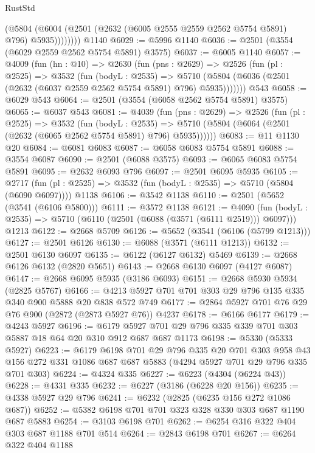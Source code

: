 \begin{lexlean}{RustStd}
\begin{coremodule}
              (@5804 (@6004 (@2501 (@2632 (@6005 @2555 @2559 @2562 @5754 @5891) @796) @5935))))))))
    @1140
@6029 := @5996 @1140
@6036 := @2501 (@3554 (@6029 @2559 @2562 @5754 @5891) @3575)
@6037 := @6005 @1140
@6057 := @4009
    (fun (hn : @10) =>
    @2630
      (fun (pns : @2629) =>
      @2526
        (fun (pl : @2525) =>
        @3532
          (fun (bodyL : @2535) =>
          @5710 (@5804 (@6036 (@2501 (@2632 (@6037 @2559 @2562 @5754 @5891) @796) @5935)))))))
    @543
@6058 := @6029 @543
@6064 := @2501 (@3554 (@6058 @2562 @5754 @5891) @3575)
@6065 := @6037 @543
@6081 := @4039
    (fun (pns : @2629) =>
    @2526
      (fun (pl : @2525) =>
      @3532
        (fun (bodyL : @2535) =>
        @5710 (@5804 (@6064 (@2501 (@2632 (@6065 @2562 @5754 @5891) @796) @5935))))))
@6083 := @11 @1130 @20
@6084 := @6081 @6083
@6087 := @6058 @6083 @5754 @5891
@6088 := @3554 @6087
@6090 := @2501 (@6088 @3575)
@6093 := @6065 @6083 @5754 @5891
@6095 := @2632 @6093 @796
@6097 := @2501 @6095 @5935
@6105 := @2717
    (fun (pl : @2525) => @3532 (fun (bodyL : @2535) => @5710 (@5804 (@6090 @6097))))
    @1138
@6106 := @3542 @1138
@6110 := @2501 (@5652 (@3541 (@6106 @5800)))
@6111 := @3572 @1138
@6121 := @4090
    (fun (bodyL : @2535) => @5710 (@6110 (@2501 (@6088 (@3571 (@6111 @2519))) @6097)))
    @1213
@6122 := @2668 @5709
@6126 := @5652 (@3541 (@6106 (@5799 @1213)))
@6127 := @2501 @6126
@6130 := @6088 (@3571 (@6111 @1213))
@6132 := @2501 @6130 @6097
@6135 := @6122 (@6127 @6132) @5469
@6139 := @2668 @6126 @6132 (@2820 @5651)
@6143 := @2668 @6130 @6097 (@4127 @6087)
@6147 := @2668 @6095 @5935 (@3186 @6093)
@6151 := @2668 @5930 @5934 (@2825 @5767)
@6166 := @4213 @5927 @701 @701 @303 @29 @796 @135 @335 @340 @900 @5888 @20 @838 @572 @749
@6177 := @2864 @5927 @701 @76 @29 @76 @900 (@2872 (@2873 @5927 @76)) @4237
@6178 := @6166 @6177
@6179 := @4243 @5927
@6196 := @6179 @5927 @701 @29 @796 @335 @339 @701 @303 @5887 @18 @64 @20 @310 @912 @687 @687 @1173
@6198 := @5330 (@5333 @5927)
@6223 := @6179
    @6198
    @701
    @29
    @796
    @335
    @20
    @701
    @303
    @958
    @43
    @156
    @272
    @331
    @1086
    @687
    @687
    @5883
    (@4294 @5927 @701 @29 @796 @335 @701 @303)
@6224 := @4324 @335
@6227 := @6223 (@4304 (@6224 @43))
@6228 := @4331 @335
@6232 := @6227 (@3186 (@6228 @20 @156))
@6235 := @4338 @5927 @29 @796
@6241 := @6232 (@2825 (@6235 @156 @272 @1086 @687))
@6252 := @5382 @6198 @701 @701 @323 @328 @330 @303 @687 @1190 @687 @5883
@6254 := @3103 @6198 @701
@6262 := @6254 @316 @322 @404 @303 @687 @1188 @701 @514
@6264 := @2843 @6198 @701
@6267 := @6264 @322 @404 @1188

\end{coremodule}
\end{lexlean}
